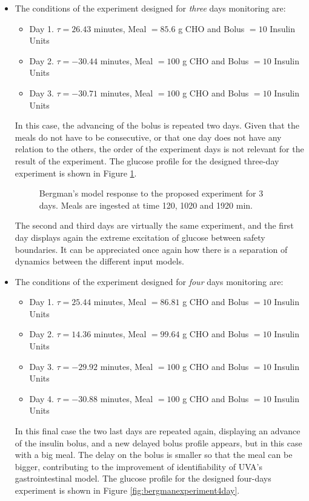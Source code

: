 \begin{itemize}
\item{The conditions of the experiment designed for \textit{three} days monitoring are:
\begin{itemize}
	\item Day 1. $\tau = 26.43$ minutes, Meal $= 85.6$ g CHO and Bolus $=10$ Insulin Units
	\item Day 2. $\tau = -30.44$ minutes, Meal $= 100$ g CHO and Bolus $=10$ Insulin Units
	\item Day 3. $\tau = -30.71$ minutes, Meal $= 100$ g CHO and Bolus $=10$ Insulin Units
\end{itemize}

In this case, the advancing of the bolus is repeated two days. Given that the meals do not have to be consecutive, or that one day does not have any relation to the others, the order of the experiment days is not relevant for the result of the experiment. The glucose profile for the designed three-day experiment is shown in Figure \ref{fig:bergmanexperiment3day}.

\begin{figure}[hbt]
\centering
{}\caption{Bergman's model response to the proposed experiment for 3 days. Meals are ingested at time 120, 1020 and 1920 min.}
\label{fig:bergmanexperiment3day}
\end{figure}

The second and third days are virtually the same experiment, and the first day displays again the extreme excitation of glucose between safety boundaries. It can be appreciated once again how there is a separation of dynamics between the different input models.}

\item{The conditions of the experiment designed for \textit{four} days monitoring are:
\begin{itemize}
	\item Day 1. $\tau = 25.44$ minutes, Meal $= 86.81$ g CHO and Bolus $=10$ Insulin Units
	\item Day 2. $\tau = 14.36$ minutes, Meal $= 99.64$ g CHO and Bolus $=10$ Insulin Units
	\item Day 3. $\tau = -29.92$ minutes, Meal $= 100$ g CHO and Bolus $=10$ Insulin Units
	\item Day 4. $\tau = -30.88$ minutes, Meal $= 100$ g CHO and Bolus $=10$ Insulin Units
\end{itemize}

In this final case the two last days are repeated again, displaying an advance of the insulin bolus, and a new delayed bolus profile appears, but in this case with a big meal. The delay on the bolus is smaller so that the meal can be bigger, contributing to the improvement of identifiability of UVA's gastrointestinal model. The glucose profile for the designed four-days experiment is shown in Figure \ref{fig:bergmanexperiment4day}.

}
\end{itemize}
